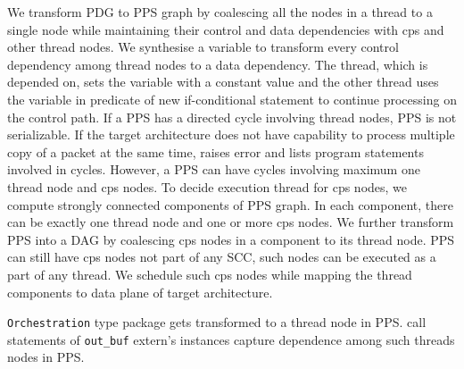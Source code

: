 \documentclass[letterpaper,twocolumn,10pt]{article}
\begin{document}
We transform PDG to PPS graph by coalescing all the nodes in a thread 
to a single node while maintaining their control and data dependencies 
with cps and other thread nodes.
We synthesise a variable to transform every control dependency among 
thread nodes to a data dependency.
The thread, which is depended on, sets the variable with a constant 
value and the other thread uses the variable in predicate of new 
if-conditional statement to continue processing on the control path.
If a PPS has a directed cycle involving thread nodes, PPS is not 
serializable.
If the target architecture does not have capability to process 
multiple copy of a packet at the same time, 
\ucomp raises error and lists program statements involved in cycles.
However, a PPS can have cycles involving maximum one thread node and 
cps nodes.
To decide execution thread for cps nodes, we compute strongly 
connected components of PPS graph.
In each component, there can be exactly one thread node and one or 
more cps nodes.
We further transform PPS into a DAG by coalescing cps nodes in a 
component to its thread node.
PPS can still have cps nodes not part of any SCC, such nodes can be 
executed as a part of any thread.
We schedule such cps nodes while mapping the thread components to data 
plane of target architecture.

\texttt{Orchestration} type package gets transformed to a thread node 
in PPS.
call statements of \texttt{out\_buf} extern's instances capture 
dependence among such threads nodes in PPS.

\end{document}
